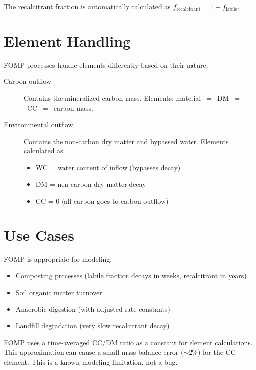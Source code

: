 \begin{notebox}
The recalcitrant fraction is automatically calculated as $f_{\text{recalcitrant}} = 1 - f_{\text{labile}}$.
\end{notebox}

\section{Element Handling}

FOMP processes handle elements differently based on their nature:

\begin{description}
  \item[Carbon outflow] Contains the mineralized carbon mass. Elements: material~$=$~DM~$=$~CC~$=$~carbon mass.
  \item[Environmental outflow] Contains the non-carbon dry matter and bypassed water. Elements calculated as:
  \begin{itemize}
    \item WC = water content of inflow (bypasses decay)
    \item DM = non-carbon dry matter decay
    \item CC = 0 (all carbon goes to carbon outflow)
  \end{itemize}
\end{description}

\section{Use Cases}

FOMP is appropriate for modeling:
\begin{itemize}
  \item Composting processes (labile fraction decays in weeks, recalcitrant in years)
  \item Soil organic matter turnover
  \item Anaerobic digestion (with adjusted rate constants)
  \item Landfill degradation (very slow recalcitrant decay)
\end{itemize}

\begin{warnbox}
FOMP uses a time-averaged CC/DM ratio as a constant for element calculations. This approximation can cause a small mass balance error ($\sim$2\%) for the CC element. This is a known modeling limitation, not a bug.
\end{warnbox}
